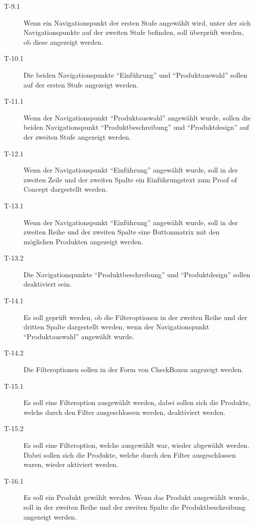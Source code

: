 \begin{description}
\item[T-9.1\label{itm:T-9.1}]
Wenn ein Navigationspunkt der ersten Stufe angewählt wird, unter der sich
Navigationspunkte auf der zweiten Stufe befinden, soll überprüft werden, ob
diese angezeigt werden.

\item[T-10.1\label{itm:T-10.1}]
Die beiden Navigationspunkte ``Einführung'' und ``Produktauswahl'' sollen auf
der ersten Stufe angezeigt werden.

\item[T-11.1\label{itm:T-11.1}]
Wenn der Navigationspunkt ``Produktauswahl'' angewählt wurde, sollen die beiden
Navigationspunkt ``Produktbeschreibung'' und ``Produktdesign'' auf der zweiten
Stufe angezeigt werden.

\item[T-12.1\label{itm:T-12.1}]
Wenn der Navigationspunkt ``Einführung'' angewählt wurde, soll in der zweiten
Zeile und der zweiten Spalte ein Einführungstext zum Proof of Concept
dargestellt werden.

\item[T-13.1\label{itm:T-13.1}]
Wenn der Navigationspunkt ``Einführung'' angewählt wurde, soll in der zweiten
Reihe und der zweiten Spalte eine Buttonmatrix mit den möglichen Produkten
angezeigt werden.

\item[T-13.2\label{itm:T-13.2}]
Die Navigationspunkte ``Produktbeschreibung'' und ``Produktdesign'' sollen
deaktiviert sein.

\item[T-14.1\label{itm:T-14.1}]
Es soll geprüft werden, ob die Filteroptionen in der zweiten Reihe und der
dritten Spalte dargestellt werden, wenn der Navigationspunkt ``Produktauswahl''
angewählt wurde.

\item[T-14.2\label{itm:T-14.2}]
Die Filteroptionen sollen in der Form von CheckBoxen angezeigt werden.

\item[T-15.1\label{itm:T-15.1}]
Es soll eine Filteroption ausgewählt werden, dabei sollen sich die Produkte,
welche durch den Filter ausgeschlossen werden, deaktiviert werden.

\item[T-15.2\label{itm:T-15.2}]
Es soll eine Filteroption, welche ausgewählt war, wieder abgewählt werden. Dabei
sollen sich die Produkte, welche durch den Filter ausgeschlossen waren, wieder
aktiviert werden.

\item[T-16.1\label{itm:T-16.1}]
Es soll ein Produkt gewählt werden. Wenn das Produkt ausgewählt wurde, soll in
der zweiten Reihe und der zweiten Spalte die Produktbeschreibung angezeigt
werden.


\end{description}
